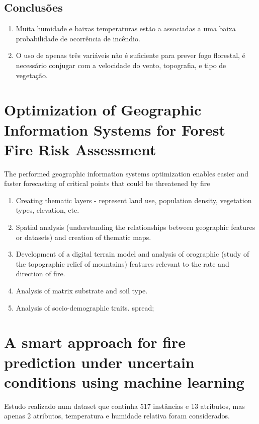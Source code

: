 \documentclass{article}
\begin{document}
\subsection{Conclusões}
\begin{enumerate}
    \item Muita humidade e baixas temperaturas estão a associadas a uma baixa probabilidade de ocorrência de incêndio.
    \item O uso de apenas três variáveis não é suficiente para prever fogo florestal, é necessário conjugar com a velocidade do vento, topografia, e tipo de vegetação.
\end{enumerate}


\section{Optimization of Geographic Information Systems 
for Forest Fire Risk Assessment \cite{9167162}}
\label{sec:Optimization of Geographic Information Systems for Forest Fire Risk Assessment}
The performed geographic information systems optimization enables easier and faster forecasting of critical points that could be threatened by fire
\begin{enumerate}
    \item Creating thematic layers - represent land use, population density, vegetation types, elevation, etc.
    \item Spatial analysis (understanding the relationships between geographic features or datasets) and creation of thematic maps.
    \item Development of a digital terrain model and analysis of orographic (study of the topographic relief of mountains) features relevant to the rate and direction of fire.
    \item Analysis of matrix substrate and soil type.
    \item Analysis of socio-demographic traits.
spread;
\end{enumerate}


\section{A smart approach for fire prediction under uncertain
conditions using machine learning \cite{Sharma2020}}

Estudo realizado num dataset que continha 517 instâncias e 13 atributos, mas apenas 2 atributos, temperatura e humidade relativa foram considerados.
\end{document}
